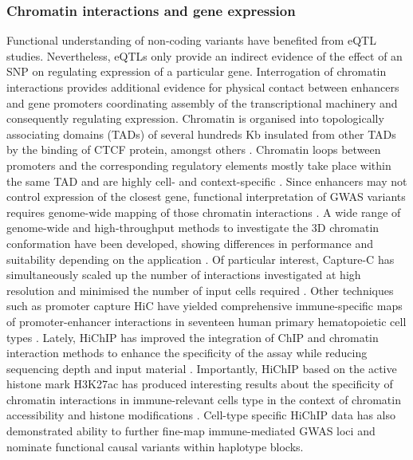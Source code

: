 \subsubsection{Chromatin interactions and gene expression}
Functional understanding of non-coding variants have benefited from eQTL studies. Nevertheless, eQTLs only provide an indirect evidence of the effect of an SNP on regulating expression of a particular gene. Interrogation of chromatin interactions provides additional evidence for physical contact
 between enhancers and gene promoters coordinating assembly of the transcriptional machinery and consequently regulating expression. Chromatin is organised into topologically associating domains (TADs) of several hundreds Kb insulated from other TADs by the binding of CTCF protein, amongst others \parencite{Nora2017}. Chromatin loops between promoters and the corresponding regulatory elements mostly take place within the same TAD and are highly cell- and context-specific \parencite{Smith2016}. Since enhancers may not control expression of the closest gene, functional interpretation of GWAS variants requires genome-wide mapping of those chromatin interactions \parencite{Smemo2014}. A wide range of genome-wide and high-throughput methods to investigate the 3D chromatin conformation have been developed, showing differences in performance and suitability depending on the application \parencite{Davies2017}. Of particular interest, Capture-C has simultaneously scaled up the number of interactions investigated at high resolution and minimised the number of input cells required \parencite{Davies2016,Oudelaar2017}. Other techniques such as promoter capture HiC have yielded comprehensive immune-specific maps of promoter-enhancer interactions in seventeen human primary hematopoietic cell types \parencite{Javierre2016}. Lately, HiChIP has improved the integration of ChIP and chromatin interaction methods to enhance the specificity of the assay while reducing sequencing depth and input material \parencite{Mumbach2016}. Importantly, HiChIP based on the active histone mark H3K27ac has produced interesting results about the specificity of chromatin interactions in immune-relevant cells type in the context of chromatin accessibility and histone modifications \parencite{Mumbach2017}. Cell-type specific HiChIP data has also demonstrated ability to further fine-map immune-mediated GWAS loci and nominate functional causal variants within haplotype blocks.


